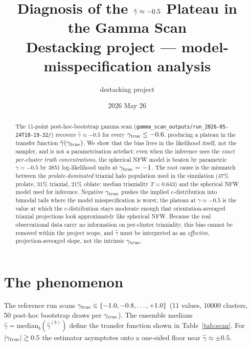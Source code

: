 \documentclass[11pt,a4paper]{article}
\title{\textbf{Diagnosis of the $\ghat \approx -0.5$ Plateau in the Gamma Scan}\\[0.4em]
\large Destacking project --- model-misspecification analysis}
\author{destacking project}
\date{2026 May 26}
\newcommand{\gtrue}{\gamma_{\rm true}}
\newcommand{\ghat}{\hat\gamma}
\begin{document}
\maketitle

\begin{abstract}
The 11-point post-hoc-bootstrap gamma scan
(\texttt{gamma\_scan\_outputs/run\_2026-05-24T10-19-32/}) recovers
$\ghat \approx -0.5$ for every $\gtrue \le -0.6$, producing a plateau in the
transfer function $\ghat(\gtrue)$. We show that the bias lives in the likelihood
itself, not the sampler, and is not a parametrisation artefact: even when the
inference uses the \emph{exact per-cluster truth concentrations}, the spherical
NFW model is beaten by parametric $\gamma = -0.5$ by 3851 log-likelihood units
at $\gtrue = -1$. The root cause is the mismatch between the
\emph{prolate-dominated} triaxial halo population used in the simulation
(47\% prolate, 31\% triaxial, 21\% oblate; median triaxiality $T = 0.643$) and
the spherical NFW model used for inference. Negative $\gtrue$ pushes the
implied $c$-distribution into bimodal tails where the model misspecification
is worst; the plateau at $\gamma \approx -0.5$ is the value at which the
$c$-distribution stays moderate enough that orientation-averaged triaxial
projections look approximately like spherical NFW. Because the real
observational data carry no information on per-cluster triaxiality, this
bias cannot be removed within the project scope, and $\ghat$ must be
interpreted as an \emph{effective}, projection-averaged slope, not the
intrinsic $\gtrue$.
\end{abstract}

\tableofcontents
\newpage

\section{The phenomenon}

The reference run scans $\gtrue \in \{-1.0,-0.8,\ldots,+1.0\}$ (11 values, 10000
clusters, 50 post-hoc bootstrap draws per $\gtrue$).  The ensemble medians
$\ghat = \mathrm{median}_b(\ghat^{(b)})$ define the transfer function
shown in Table~\ref{tab:scan}.  For $|\gtrue| \gtrsim 0.5$ the estimator
asymptotes onto a one-sided floor near $\ghat \approx \pm 0.5$.
\end{document}

